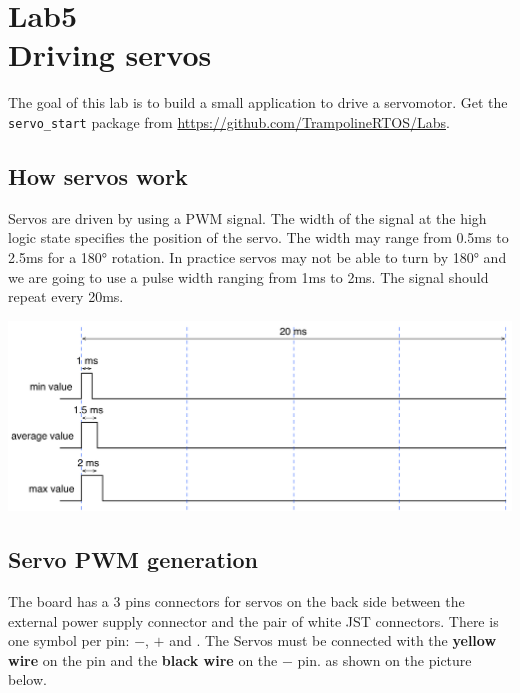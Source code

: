 \documentclass[11pt]{report}
\begin{document}
\chapter{Lab5\\Driving servos}

The goal of this lab is to build a small application to drive a servomotor. Get the \texttt{servo_start} package from \url{https://github.com/TrampolineRTOS/Labs}.

\section{How servos work}

Servos are driven by using a PWM signal. The width of the signal at the high logic state specifies the position of the servo. The width may range from 0.5ms to 2.5ms for a 180° rotation. In practice servos may not be able to turn by 180° and we are going to use a pulse width ranging from 1ms to 2ms. The signal should repeat every 20ms.

\includegraphics[width=\textwidth]{img/servopwm.pdf}

\section{Servo PWM generation}

The board has a 3 pins connectors for servos on the back side between the external power supply connector and the pair of white JST connectors. There is one symbol per pin: $-$, $+$ and . The Servos must be connected with the {\bf yellow wire} on the  pin and the {\bf black wire} on the $-$ pin. as shown on the picture below.
\end{document}
